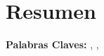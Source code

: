 \thispagestyle{plain}
\chapter*{Resumen}

\lipsum[4-6]

\textbf{Palabras Claves:} \lipsum[4][2], \lipsum[4][7], \lipsum[4][9]
